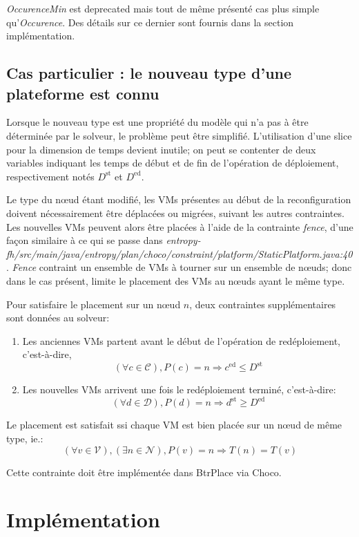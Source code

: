 \documentclass[a4paper]{article}
\begin{document}
\textit{OccurenceMin} est deprecated mais tout de même présenté cas plus
simple qu'\textit{Occurence}. Des détails sur ce dernier sont fournis
dans la section implémentation.

\subsection{Cas particulier : le nouveau type d'une plateforme est connu}
Lorsque le nouveau type est une propriété du modèle qui n'a pas à être
déterminée par le solveur, le problème peut être simplifié. L'utilisation
d'une slice pour la dimension de temps devient inutile; on peut se contenter
de deux variables indiquant les temps de début et de fin de l'opération de
déploiement, respectivement notés $D^\mathrm{st}$ et $D^\mathrm{ed}$.

Le type du nœud étant modifié, les VMs présentes au début de la reconfiguration
doivent nécessairement être déplacées ou migrées, suivant les autres
contraintes. Les nouvelles VMs peuvent alors être placées à l'aide de
la contrainte \textit{fence}, d'une façon similaire à ce qui se passe dans
\textit{entropy-fh/src/main/java/entropy/plan/choco/constraint/platform/StaticPlatform.java:40}. \textit{Fence} contraint un ensemble de VMs à tourner sur un
ensemble de nœuds; donc dans le cas présent, limite le placement des VMs
au nœuds ayant le même type.

Pour satisfaire le placement sur un nœud $n$, deux contraintes supplémentaires sont
données au solveur:

\begin{enumerate}
	\item Les anciennes VMs partent avant le début de l'opération de
		redéploiement, c'est-à-dire,
\[
	(\forall c \in \mathcal C), P(c) = n \Rightarrow c^\mathrm{ed} \leq D^\mathrm{st}
\]
	\item Les nouvelles VMs arrivent une fois le redéploiement terminé,
		c'est-à-dire:
\[
	(\forall d \in \mathcal D), P(d) = n \Rightarrow d^\mathrm{st} \geq D^\mathrm{ed}
\]
\end{enumerate}
Le placement est satisfait ssi chaque VM est bien placée sur
un nœud de même type, ie.:
\[
	(\forall v \in \mathcal V), (\exists n \in \mathcal N), P(v) = n
		\Rightarrow T(n) = T(v)	
\]

Cette contrainte doit être implémentée dans BtrPlace via Choco.

\section{Implémentation}
\end{document}
